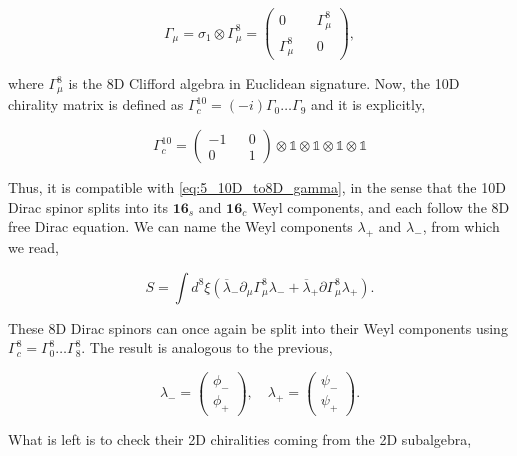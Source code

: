 \begin{equation}
    \label{eq:5_10D_to8D_gamma}
    \Gamma_\mu = \sigma_1 \otimes \Gamma^8_\mu = 
    \begin{pmatrix}
        0 && \Gamma^8_\mu \\
        \Gamma^8_\mu && 0 
    \end{pmatrix}
    ,
\end{equation}

where $\Gamma^8_\mu$ is the 8D Clifford algebra in Euclidean signature. Now, the 10D chirality matrix is defined as $\Gamma_c^{10} = (-i) \Gamma_0 \dots \Gamma_9$ and it is explicitly,

\begin{equation}
    \Gamma_c^{10} = \begin{pmatrix}
        -1 && 0 \\
        0 && 1
    \end{pmatrix}
    \otimes \mathbb{1}\otimes \mathbb{1}\otimes \mathbb{1}\otimes \mathbb{1}
\end{equation}

Thus, it is compatible with \ref{eq:5_10D_to8D_gamma}, in the sense that the 10D Dirac spinor splits into its $\mathbf{16}_s$ and $\mathbf{16}_c$ Weyl components, and each follow the 8D free Dirac equation. We can name the Weyl components $\lambda_+$ and $\lambda_-$, from which we read,

\begin{equation}
    S = \int d^8 \xi \left( \overline{\lambda}_-\partial_\mu \Gamma^8_\mu \lambda_- + \overline{\lambda}_+ \partial \Gamma^8_\mu \lambda_+ \right).
\end{equation}

These 8D Dirac spinors can once again be split into their Weyl components using $\Gamma^8_c = \Gamma^8_0 \dots \Gamma^8_8$. The result is analogous to the previous,

\begin{equation}
    \lambda_- = \begin{pmatrix}
        \phi_- \\ \phi_+
    \end{pmatrix}, \quad \lambda_+ = \begin{pmatrix}
        \psi_- \\ \psi_+
    \end{pmatrix}.
\end{equation}

What is left is to check their 2D chiralities coming from the 2D subalgebra, 

